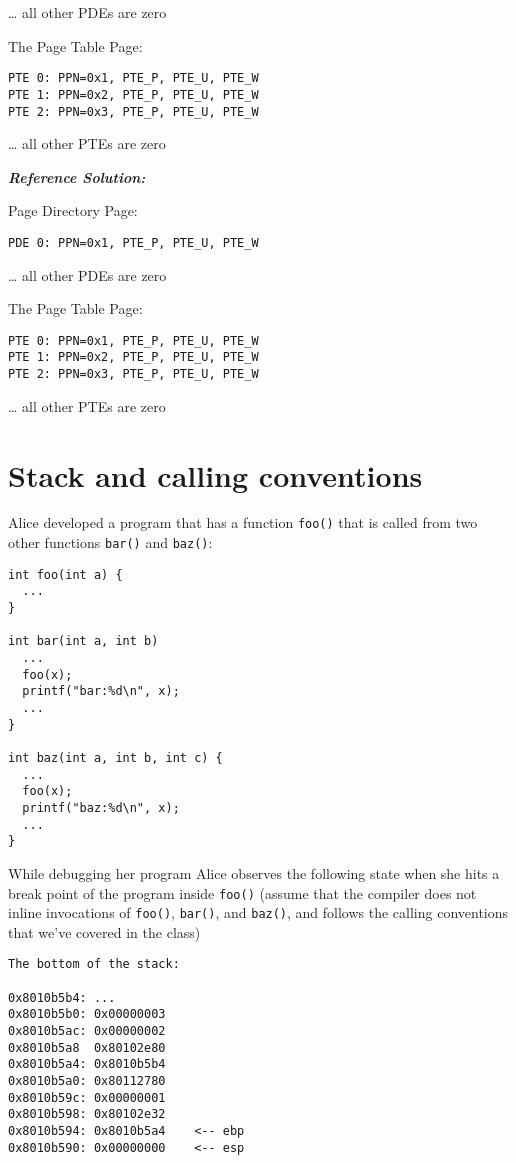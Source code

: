 \documentclass[]{article}
\begin{document}
\ldots{} all other PDEs are zero

The Page Table Page:

\begin{verbatim}
PTE 0: PPN=0x1, PTE_P, PTE_U, PTE_W
PTE 1: PPN=0x2, PTE_P, PTE_U, PTE_W
PTE 2: PPN=0x3, PTE_P, PTE_U, PTE_W
\end{verbatim}

\ldots{} all other PTEs are zero

\textbf{\emph{Reference Solution:}}

Page Directory Page:

\texttt{PDE\ 0:\ PPN=0x1,\ PTE\_P,\ PTE\_U,\ PTE\_W}

\ldots{} all other PDEs are zero

The Page Table Page:

\begin{verbatim}
PTE 0: PPN=0x1, PTE_P, PTE_U, PTE_W
PTE 1: PPN=0x2, PTE_P, PTE_U, PTE_W
PTE 2: PPN=0x3, PTE_P, PTE_U, PTE_W
\end{verbatim}

\ldots{} all other PTEs are zero

\hypertarget{stack-and-calling-conventions}{%
\section{Stack and calling
conventions}\label{stack-and-calling-conventions}}

Alice developed a program that has a function \texttt{foo()} that is
called from two other functions \texttt{bar()} and \texttt{baz()}:

\begin{verbatim}
int foo(int a) {
  ...
}

int bar(int a, int b) 
  ...
  foo(x);
  printf("bar:%d\n", x);
  ...
}

int baz(int a, int b, int c) {
  ...
  foo(x);
  printf("baz:%d\n", x);
  ...
}
\end{verbatim}

While debugging her program Alice observes the following state when she
hits a break point of the program inside \texttt{foo()} (assume that the
compiler does not inline invocations of \texttt{foo()}, \texttt{bar()},
and \texttt{baz()}, and follows the calling conventions that we've
covered in the class)

\begin{verbatim}
The bottom of the stack:

0x8010b5b4: ...
0x8010b5b0: 0x00000003
0x8010b5ac: 0x00000002
0x8010b5a8  0x80102e80
0x8010b5a4: 0x8010b5b4
0x8010b5a0: 0x80112780
0x8010b59c: 0x00000001
0x8010b598: 0x80102e32
0x8010b594: 0x8010b5a4    <-- ebp
0x8010b590: 0x00000000    <-- esp
\end{verbatim}
\end{document}
